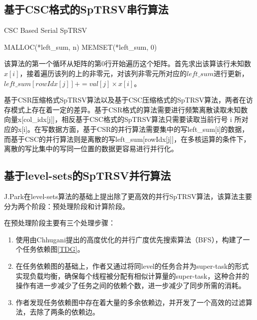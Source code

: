 \subsection{基于CSC格式的SpTRSV串行算法}

\begin{algorithm}
    \caption{CSC Based Serial SpTRSV}\label{csc-serial-sptrsv}
    MALLOC(*left\_sum, n) \;
    MEMSET(*left\_sum, 0) \;
\end{algorithm}

该算法的第一个循环从矩阵的第0行开始遍历这个矩阵。首先求出该算该行未知数$x[i]$，接着遍历该列的上的非零元，对该列非零元所对应的$left\_sum$进行更新，$left\_sum[rowIdx[j]] += val[j] \times x[i]$。

基于CSR压缩格式SpTRSV算法以及基于CSC压缩格式的SpTRSV算法，两者在访存模式上存在着一定的差异。基于CSR格式的算法需要进行频繁离散读取未知数向量x[col\_idx[j]]，相反基于CSC格式的SpTRSV算法只需要读取当前行号 i 所对应的x[i]。在写数据方面，基于CSR的并行算法需要集中的写left\_sum[i]的数据，而基于CSC的并行算法则是离散的写left\_sum[rowIdx[j]]，在多核运算的条件下，离散的写比集中的写同一位置的数据更容易进行并行化。

\subsection{基于level-sets的SpTRSV并行算法}

J.Park在level-sets算法的基础上提出除了更高效的并行SpTRSV算法\cite{park2014sparsifying}，该算法主要分为两个阶段：预处理阶段和计算阶段。

在预处理阶段主要有三个处理步骤：
\begin{enumerate} \setlength{\itemsep}{0pt}
\item 使用由Chhugani\cite{chhuganiFastEfficientGraph2012a}提出的高度优化的并行广度优先搜索算法（BFS），构建了一个任务依赖图\ref{TDG}。
\item 在任务依赖图的基础上，作者又通过将同level的任务合并为super-task的形式实现负载均衡，确保每个线程被分配有相似计算量的super-task，这种合并的操作有进一步减少了任务之间的依赖个数，进一步减少了同步所需的消耗。
\item 作者发现任务依赖图中存在着大量的多余依赖边，并开发了一个高效的过滤算法，去除了两条的依赖边。
\end{enumerate}

